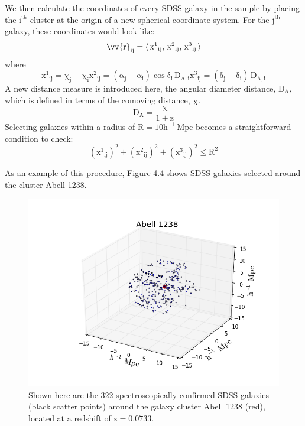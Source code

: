 We then calculate the coordinates of every SDSS galaxy in the sample by placing
the $\mathrm{i^{th}}$ cluster at the origin of a new spherical coordinate
system. For the $\mathrm{j^{th}}$ galaxy, these coordinates would look like:
\begin{equation}
\mathrm{{\vv{r}}_{ij} = \langle\, {x^{1}}_{ij},\, {x^{2}}_{ij},\, {x^{3}}_{ij}\, \rangle}
\end{equation}
where
\begin{subequations}
\begin{equation}
\mathrm{{x^{1}}_{ij} = \chi_{j} - \chi_{i}}
\end{equation}    
\begin{equation}
\mathrm{{x^{2}}_{ij} = (\alpha_{j} - \alpha_{i}) \cos \delta_{i} \, D_{A,i}}
\end{equation}
\begin{equation}
\mathrm{{x^{3}}_{ij} = (\delta_{j} - \delta_{i}) \, D_{A,i}}
\end{equation}
\end{subequations}
A new distance measure is introduced here, the angular diameter distance,
$\mathrm{D_{A}}$, which is defined in terms of the comoving distance,
$\mathrm{\chi}$.
\begin{equation}
\mathrm{D_{A} = \frac{\chi}{1+z}}
\end{equation}
Selecting galaxies within a radius of $\mathrm{R = 10 h^{-1}\, Mpc}$ becomes a
straightforward condition to check:
\begin{equation}
\mathrm{({x^{1}}_{ij})^{2} + ({x^{2}}_{ij})^{2} +  ({x^{3}}_{ij})^{2} \le R^{2}} 
\end{equation}

As an example of this procedure, Figure 4.4 shows SDSS galaxies selected around
the cluster Abell 1238.

\begin{figure}
\begin{center}
\includegraphics[width=\textwidth]{images/ClusterEnvironment/Abell1238.png}
\end{center}
\caption[Selecting Galaxies Around Clusters]{Shown here are the 322 spectroscopically confirmed SDSS galaxies
  (black scatter points) around the galaxy cluster Abell 1238 (red), located at a
  redshift of $\mathrm{z=0.0733}$.}
\end{figure}

